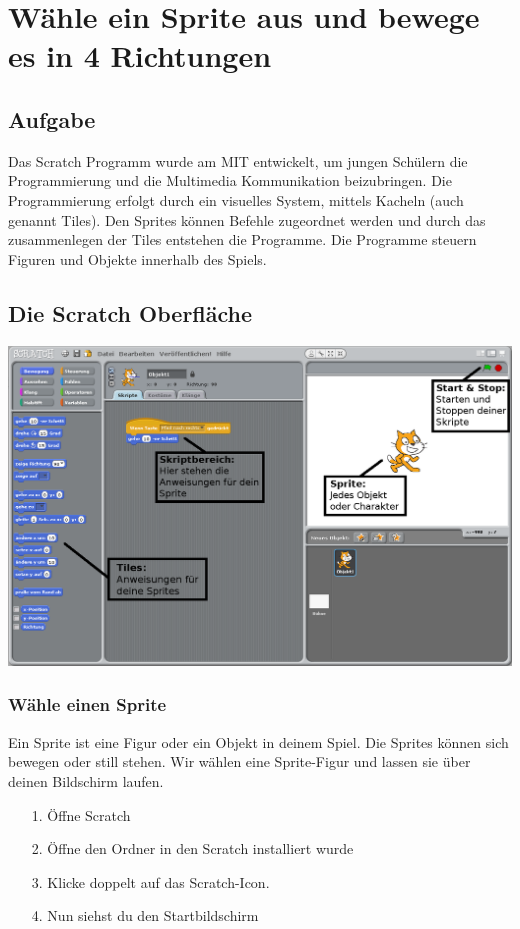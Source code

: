 \section{Wähle ein Sprite aus und bewege es in 4 Richtungen}
\subsection{Aufgabe}
Das Scratch Programm wurde am MIT entwickelt, um jungen Schülern die Programmierung und die Multimedia Kommunikation beizubringen. \newline
Die Programmierung erfolgt durch ein visuelles System, mittels Kacheln (auch genannt Tiles). Den Sprites können Befehle zugeordnet werden und durch das zusammenlegen der Tiles entstehen die Programme. Die Programme steuern Figuren und Objekte innerhalb des Spiels.


\subsection{Die Scratch Oberfläche}
\includegraphics[width=\textwidth]{images/aufgabe1_uebersicht.png}

\subsubsection{Wähle einen Sprite}

Ein Sprite ist eine Figur oder ein Objekt in deinem Spiel. Die Sprites können sich bewegen oder still stehen. Wir wählen eine Sprite-Figur und lassen sie über deinen Bildschirm laufen.
\begin{itemize}
\item[1.] Öffne Scratch
\item[2.] Öffne den Ordner in den Scratch installiert wurde
\item[3.] Klicke doppelt auf das Scratch-Icon.
\item[4.] Nun siehst du den Startbildschirm
\end{itemize}

